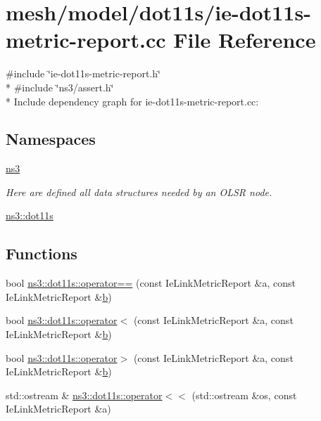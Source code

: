 \hypertarget{ie-dot11s-metric-report_8cc}{}\section{mesh/model/dot11s/ie-\/dot11s-\/metric-\/report.cc File Reference}
\label{ie-dot11s-metric-report_8cc}
{\ttfamily \#include \char`\"{}ie-\/dot11s-\/metric-\/report.\+h\char`\"{}}\\*
{\ttfamily \#include \char`\"{}ns3/assert.\+h\char`\"{}}\\*
Include dependency graph for ie-\/dot11s-\/metric-\/report.cc\+:
\subsection*{Namespaces}
\begin{DoxyCompactItemize}
\item 
 \hyperlink{namespacens3}{ns3}
\begin{DoxyCompactList}\small\item\em Here are defined all data structures needed by an O\+L\+SR node. \end{DoxyCompactList}\item 
 \hyperlink{namespacens3_1_1dot11s}{ns3\+::dot11s}
\end{DoxyCompactItemize}
\subsection*{Functions}
\begin{DoxyCompactItemize}
\item 
bool \hyperlink{namespacens3_1_1dot11s_a791fd928325c7f4c38a4130951fc3abf}{ns3\+::dot11s\+::operator==} (const Ie\+Link\+Metric\+Report \&a, const Ie\+Link\+Metric\+Report \&\hyperlink{lte__pathloss_8m_a21ad0bd836b90d08f4cf640b4c298e7c}{b})
\item 
bool \hyperlink{namespacens3_1_1dot11s_a712de4d131042d7602f9bac0f5bd8460}{ns3\+::dot11s\+::operator$<$} (const Ie\+Link\+Metric\+Report \&a, const Ie\+Link\+Metric\+Report \&\hyperlink{lte__pathloss_8m_a21ad0bd836b90d08f4cf640b4c298e7c}{b})
\item 
bool \hyperlink{namespacens3_1_1dot11s_a3b004e1f897b553adb22c45f5e3ea45a}{ns3\+::dot11s\+::operator$>$} (const Ie\+Link\+Metric\+Report \&a, const Ie\+Link\+Metric\+Report \&\hyperlink{lte__pathloss_8m_a21ad0bd836b90d08f4cf640b4c298e7c}{b})
\item 
std\+::ostream \& \hyperlink{namespacens3_1_1dot11s_a89ead06e9318289d69ed6fbfb1de8924}{ns3\+::dot11s\+::operator$<$$<$} (std\+::ostream \&os, const Ie\+Link\+Metric\+Report \&a)
\end{DoxyCompactItemize}
